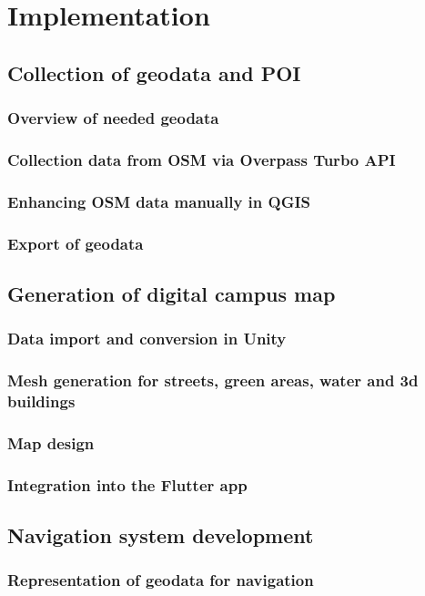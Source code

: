 \chapter{Implementation}
\label{cha:implementation}
\section{Collection of geodata and POI}
\subsection{Overview of needed geodata}
\subsection{Collection data from OSM via Overpass Turbo API}
\subsection{Enhancing OSM data manually in QGIS}
\subsection{Export of geodata}

\section{Generation of digital campus map}
\subsection{Data import and conversion in Unity}
\subsection{Mesh generation for streets, green areas, water and 3d buildings}
\subsection{Map design}
\subsection{Integration into the Flutter app}

\section{Navigation system development}
\subsection{Representation of geodata for navigation}
